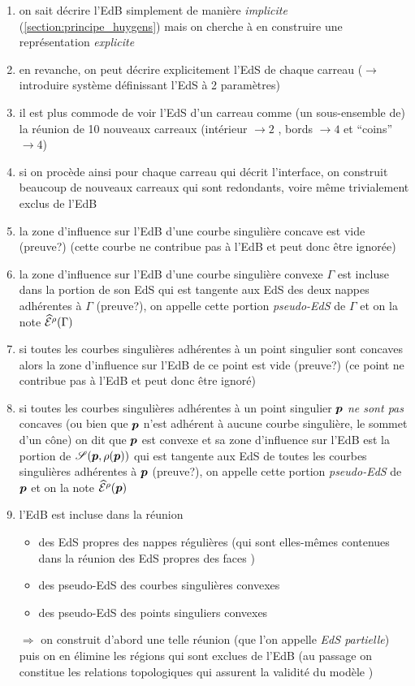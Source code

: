 \begin{enumerate}
	\item on sait décrire l'EdB simplement de manière \textit{implicite} (\cf \autoref{section:principe_huygens}) mais on cherche à en construire une représentation \textit{explicite}
	\item en revanche, on peut décrire explicitement l'EdS de chaque carreau ($\to$ introduire système définissant l'EdS à 2 paramètres)
	\item il est plus commode de voir l'EdS d'un carreau comme (un sous-ensemble de) la réunion de 10 nouveaux carreaux (intérieur $\to 2$ , bords $\to 4$ et ``coins'' $\to 4$)
	\item si on procède ainsi pour chaque carreau qui décrit l'interface, on construit beaucoup de nouveaux carreaux qui sont redondants, voire même trivialement exclus de l'EdB
	\item la zone d'influence sur l'EdB d'une courbe singulière concave est vide (preuve?) (\ie cette courbe ne contribue pas à l'EdB et peut donc être ignorée)
	\item la zone d'influence sur l'EdB d'une courbe singulière convexe $\Gamma$ est incluse dans la portion de son EdS qui est tangente aux EdS des deux nappes adhérentes à $\Gamma$ (preuve?), on appelle cette portion \textit{pseudo-EdS} de $\Gamma$ et on la note $\widehat{\mathcal{E}}^{\rho}({\Gamma})$
	\item si toutes les courbes singulières adhérentes à un point singulier sont concaves alors la zone d'influence sur l'EdB de ce point est vide (preuve?) (\ie ce point ne contribue pas à l'EdB et peut donc être ignoré)
	\item si toutes les courbes singulières adhérentes à un point singulier $\boldsymbol{p}$ \textit{ne sont pas} concaves (ou bien que $\boldsymbol{p}$ n'est adhérent à aucune courbe singulière, \eg le sommet d'un cône) on dit que $\boldsymbol{p}$ est convexe et sa zone d'influence sur l'EdB est la portion de $\sphere[\p][\rho(\p)]$ qui est tangente aux EdS de toutes les courbes singulières adhérentes à $\boldsymbol{p}$ (preuve?), on appelle cette portion \textit{pseudo-EdS} de $\boldsymbol{p}$ et on la note $\widehat{\mathcal{E}}^{\rho}({\boldsymbol{p}})$
	\item l'EdB est incluse dans la réunion
	\begin{itemize}
		\item des EdS propres des nappes régulières (qui sont elles-mêmes contenues dans la réunion des EdS propres des faces \brep)
		\item des pseudo-EdS des courbes singulières convexes
		\item des pseudo-EdS des points singuliers convexes
	\end{itemize}
	\item[$\Rightarrow$] on construit d'abord une telle réunion (que l'on appelle \textit{EdS partielle}) puis on en élimine les régions qui sont exclues de l'EdB (au passage on constitue les relations topologiques qui assurent la validité du modèle \brep)
\end{enumerate}












